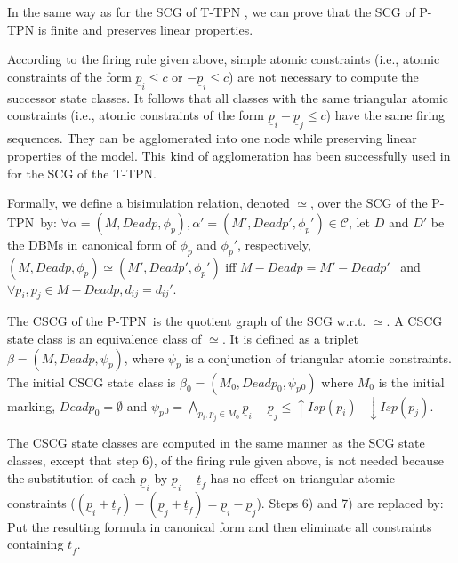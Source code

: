 \documentclass[submission,copyright,creativecommons]{eptcs}
\numberwithin{equation}{section}
\def\tppn{P-TPN}
\def\ttpn{T-TPN}
\begin{document}
\par In the same way as for the SCG of T-TPN \cite{BVer03}, we can prove that the SCG of P-TPN is finite and  preserves linear properties.
\par According to the firing rule given above, simple atomic constraints (i.e., atomic constraints of the form $\underline{p}_i \leq c$ or $-\underline{p}_i \leq c$) are not necessary to compute the successor state classes. It follows that all classes with the same triangular atomic constraints (i.e., atomic constraints of the form $\underline{p}_i-\underline{p}_j \leq c$) have the same firing sequences. They can be agglomerated into one node while preserving linear
properties of the model. This kind of agglomeration has been successfully used in \cite{acsd07} for the SCG of the \ttpn.
\par Formally, we define a bisimulation relation, denoted $\simeq$, over the SCG of the \tppn~by: $\forall \alpha=(M,Deadp,\phi_p),
\alpha'=(M', Deadp', \phi_p') \in \mathcal{C}$, let $D$ and $D'$ be the DBMs in canonical form of $\phi_p$ and $\phi_p'$, respectively,  $(M, Deadp,\phi_p) \simeq
(M', Deadp', \phi_p')$ iff $M - Deadp = M' -Deadp'$ \ and \ $\forall p_i, p_j \in M-Deadp, d_{ij} = d_{ij}'$.
\par The CSCG of the \tppn~is the quotient graph of the SCG w.r.t. $\simeq$. A CSCG state class is an equivalence class of $\simeq$. It is defined as a triplet $\beta=(M, Deadp, \psi_p)$, where $\psi_p$ is a conjunction of triangular atomic constraints. The initial CSCG state class is \(\beta_0=(M_{0}, Deadp_0,\psi_p{_0})\) where $M_0$ is the initial marking, $Deadp_0=\emptyset$ and $\psi_p{_0} = \underset{p_i, p_j
\in M_{0}} \bigwedge { \underline{p}_i - \underline{p}_j \leq
{\uparrow Isp(p_i)} - \downarrow Isp(p_j)}$.
\par The CSCG state classes are computed in the same manner as the SCG state classes, except that step 6), of the firing rule given above, is not needed because the substitution of each $\underline{p}_i$ by $\underline{p}_i+\underline{t}_f$ has no effect on triangular atomic constraints ($(\underline{p}_i + \underline{t}_f) - (\underline{p}_j + \underline{t}_f)= \underline{p}_i - \underline{p}_j$). Steps 6) and 7) are replaced by:
Put the resulting formula  in canonical form and then eliminate all constraints containing $\underline{t}_f$.
\end{document}
